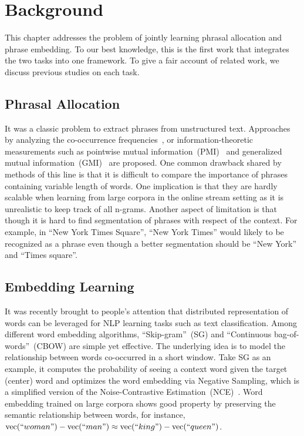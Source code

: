 \section{Background}

This chapter addresses the problem of jointly learning phrasal allocation and phrase
embedding. To our best knowledge, this is the first work that integrates
the two tasks into one framework. To give a fair account of related work, we
discuss previous studies on each task.

\subsection{Phrasal Allocation}

It was a classic problem to extract phrases from unstructured text. Approaches
by analyzing the co-occurrence
frequencies~\cite{witten1999kea,lindsey2012phrase,wang2007topical}, or
information-theoretic measurements such as pointwise mutual
information~(PMI)~\cite{fano1961transmission,church1990word} and generalized
mutual information~(GMI)~\cite{magerman1990parsing} are proposed. One common
drawback shared by methods of this line is that it is difficult to compare the
importance of phrases containing variable length of words. One implication is
that they are hardly scalable when learning from large corpora in the online
stream setting as it is unrealistic to keep track of all n-grams. Another aspect
of limitation is that though it is hard to find segmentation of phrases with
respect of the context. For example, in ``New York Times Square'', ``New York
Times'' would likely to be recognized as a phrase even though a better
segmentation should be ``New York'' and ``Times square''.

\subsection{Embedding Learning}

It was recently brought to people's attention that distributed representation of
words can be leveraged for NLP learning tasks such as text classification. Among
different word embedding algorithms, ``Skip-gram''~(SG) and ``Continuous
bag-of-words''~(CBOW) are simple yet effective. The underlying idea is to model
the relationship between words co-occurred in a short window. Take SG as an
example, it computes the probability of seeing a context word given the target
(center) word and optimizes the word embedding via Negative Sampling, which is a
simplified version of the Noise-Contrastive
Estimation~(NCE)~\cite{gutmann2010noise}.  Word embedding trained on large
corpora shows good property by preserving the semantic relationship between
words, for instance, $\text{vec}(``woman") - \text{vec}(``man") \approx
\text{vec}(``king") - \text{vec}(``queen")$.

